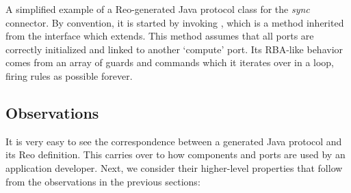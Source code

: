 \begin{listing}[h!]
	\centering
	\inputminted{java}{java_gen_2.java}
	\caption[Reo-generated Java protocol class of the sync connector.]{A simplified example of a Reo-generated Java protocol class for the \textit{sync} connector. By convention, it is started by invoking , which is a method inherited from the  interface which  extends. This method assumes that all ports are correctly initialized and linked to another `compute' port. Its RBA-like behavior comes from an array of guards and commands which it iterates over in a loop, firing rules as possible forever.}
	\label{listing:java_gen_2}
\end{listing}

\subsection{Observations}
\label{sec:java_observations}
It is very easy to see the correspondence between a generated Java protocol and its Reo definition. This carries over to how components and ports are used by an application developer. Next, we consider their higher-level properties that follow from the observations in the previous sections:




